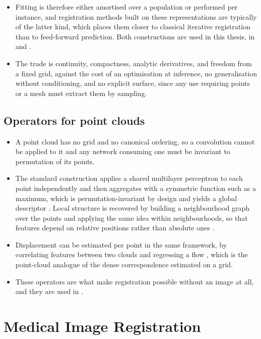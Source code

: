 \begin{itemize}
\item Fitting is therefore either amortised over a population or performed per instance, and registration methods built on these representations are typically of the latter kind, which places them closer to classical iterative registration than to feed-forward prediction. Both constructions are used in this thesis, in  and .
\item The trade is continuity, compactness, analytic derivatives, and freedom from a fixed grid, against the cost of an optimisation at inference, no generalisation without conditioning, and no explicit surface, since any use requiring points or a mesh must extract them by sampling.
\end{itemize}

\subsection{Operators for point clouds}
\begin{itemize}
\item A point cloud has no grid and no canonical ordering, so a convolution cannot be applied to it and any network consuming one must be invariant to permutation of its points.
\item The standard construction applies a shared multilayer perceptron to each point independently and then aggregates with a symmetric function such as a maximum, which is permutation-invariant by design and yields a global descriptor \citep{qi2017pointnet}. Local structure is recovered by building a neighbourhood graph over the points and applying the same idea within neighbourhoods, so that features depend on relative positions rather than absolute ones \citep{wang2019dgcnn}.
\item Displacement can be estimated per point in the same framework, by correlating features between two clouds and regressing a flow \citep{wu2020pointpwc}, which is the point-cloud analogue of the dense correspondence estimated on a grid.
\item These operators are what make registration possible without an image at all, and they are used in .
\end{itemize}

\section{Medical Image Registration}
\label{sec:bg-registration}

